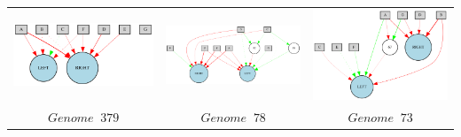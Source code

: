 \begin{table}[h]
\centering
\begin{tabular}{ccc}
\includegraphics[scale=0.4]{include/images/thymio_network_379.PNG} & \includegraphics[scale=0.4]{include/images/thymio_network_78.PNG} & \includegraphics[scale=0.4]{include/images/thymio_network_73.PNG} \\
$$Genome \;  \; 379$$  & $$Genome \;  \; 78$$  & $Genome \;  \; 73$  \\

\end{tabular}
\end{table}
